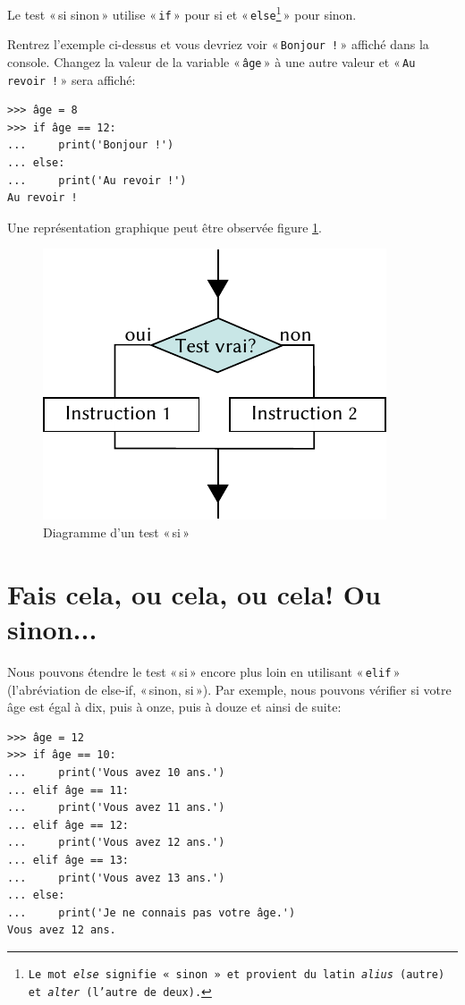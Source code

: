 Le test « si sinon » utilise « \texttt{if} » pour si et « \texttt{else\footnote{Le mot \emph{else} signifie « sinon » et provient du latin \emph{alius} (autre) et \emph{alter} (l'autre de deux).}} » pour sinon.

Rentrez l'exemple ci-dessus et vous devriez voir « \texttt{Bonjour !} » affiché dans la console.
Changez la valeur de la variable « \texttt{âge} »  à une autre valeur et « \texttt{Au revoir !} »  sera affiché:

\begin{Verbatim}[frame=single,rulecolor=\color{green}, label=à taper avec attention]
>>> âge = 8
>>> if âge == 12:
...     print('Bonjour !')
... else:
...     print('Au revoir !')
Au revoir !
\end{Verbatim}

Une représentation graphique peut être observée figure \ref{fig:Cf-else-fr}.

\begin{figure}[ht]
\centering
\includegraphics[scale=1.5]{images/Cf-else-fr.pdf}
\caption{Diagramme d'un test « si »}
\label{fig:Cf-else-fr}
\end{figure}


\section{Fais cela, ou cela, ou cela! Ou sinon...}
Nous pouvons étendre le test « si » encore plus loin en utilisant « \texttt{elif} » (l'abréviation  de else-if, « sinon, si »). Par exemple, nous pouvons vérifier si votre âge est égal à dix, puis à onze, puis à douze et ainsi de suite: 

\begin{Verbatim}[frame=single,rulecolor=\color{green}, label=à taper avec attention]
>>> âge = 12
>>> if âge == 10:
...     print('Vous avez 10 ans.')
... elif âge == 11:
...     print('Vous avez 11 ans.')
... elif âge == 12:
...     print('Vous avez 12 ans.')
... elif âge == 13:
...     print('Vous avez 13 ans.')
... else:
...     print('Je ne connais pas votre âge.')
Vous avez 12 ans.
\end{Verbatim}

